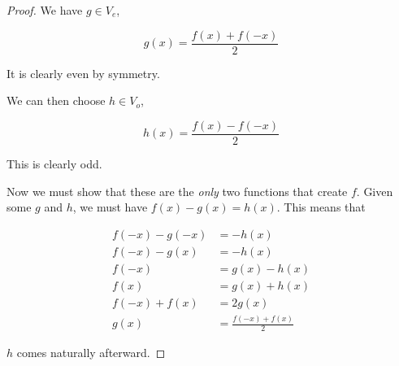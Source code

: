 \begin{enumerate}
\begin{proof}
        We have $g \in V_e$, 

        \[g(x) = \frac{f(x) + f(-x)}2\]

        It is clearly even by symmetry. 

        We can then choose $h \in V_o$,

        \[h(x) = \frac{f(x) - f(-x)}{2}\]

        This is clearly odd. 

        Now we must show that these are the \emph{only} two functions that create $f$. Given some $g$ and $h$, we must have $f(x) - g(x) = h(x)$. This means that

        \begin{align*}
            f(-x) - g(-x) &= -h(x) \\
            f(-x) - g(x) &= -h(x) \\
            f(-x) &= g(x) - h(x) \\
            f(x) &= g(x) + h(x) \\ 
            f(-x) + f(x) &= 2g(x) \\
            g(x) &= \frac{f(-x) + f(x)}{2}
        \end{align*}

        $h$ comes naturally afterward.
        
    \end{proof}



\end{enumerate}
